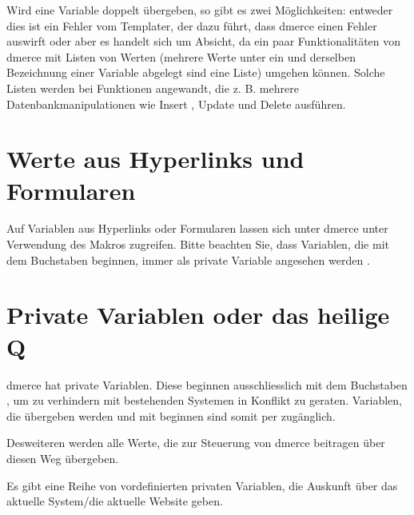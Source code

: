 Wird eine Variable doppelt \"ubergeben, so gibt es zwei
M\"oglichkeiten: entweder dies ist ein Fehler vom Templater, der dazu
f\"uhrt, dass dmerce einen Fehler auswirft oder aber es handelt sich
um Absicht, da ein paar Funktionalit\"aten von dmerce mit Listen von
Werten (mehrere Werte unter ein und derselben Bezeichnung einer
Variable abgelegt sind eine Liste) umgehen k\"onnen. Solche Listen
werden bei Funktionen angewandt, die z. B. mehrere
Datenbankmanipulationen wie Insert , Update
 und Delete 
ausf\"uhren.

\section{Werte aus Hyperlinks und Formularen}
\label{Variablen}

Auf Variablen aus Hyperlinks oder Formularen lassen sich unter dmerce
unter Verwendung des Makros  zugreifen. Bitte
beachten Sie, dass Variablen, die mit dem Buchstaben 
beginnen, immer als private Variable angesehen werden
.


\section{Private Variablen oder das heilige Q}
\label{PrivateVariablen}

dmerce hat private Variablen. Diese beginnen ausschliesslich mit dem
Buchstaben , um zu verhindern mit bestehenden Systemen in
Konflikt zu geraten. Variablen, die \"ubergeben werden und mit
 beginnen sind somit per  zug\"anglich.

Desweiteren werden alle Werte, die zur Steuerung von dmerce beitragen
\"uber diesen Weg \"ubergeben.

Es gibt eine Reihe von vordefinierten privaten Variablen, die Auskunft
\"uber das aktuelle System/die aktuelle Website geben.

\wancidmerceqvardef{qvarqTemplate}{qTemplate}{qTemplate={[}Verzeichnis{[},...{]}}{ab
  1.0}{BASIS}{Gibt dmerce das Template an, dass angezeigt werden
  soll}{}

